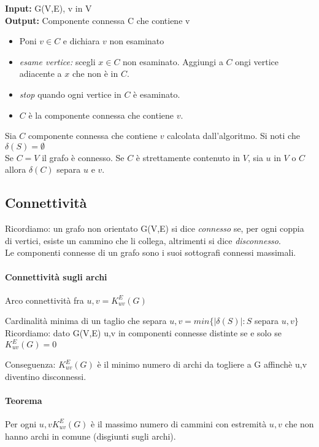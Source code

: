 \textbf{Input: }G(V,E), v in V \\
\textbf{Output:} Componente connessa C che contiene v \smallskip
\begin{itemize}
\item Poni $v \in C$ e dichiara $v$ non esaminato
\item \emph{esame vertice:} scegli $x \in C$ non esaminato. Aggiungi a $C$ ongi vertice adiacente a $x$ che non è in $C$.
\item \emph{stop} quando ogni vertice in $C$ è esaminato.
\item $C$ è la componente connessa che contiene $v$.
\end{itemize}
Sia $C$ componente connessa che contiene $v$ calcolata dall'algoritmo. Si noti che \(\delta(S) = \emptyset \) \\
Se $C=V$ il grafo è connesso. Se $C$ è strettamente contenuto in $V$, sia $u$ in $V$ o $C$ allora \(\delta(C)\) separa $u$ e $v$.\\

\subsection{Connettività}
Ricordiamo: un grafo non orientato G(V,E) si dice \emph{connesso} se, per ogni coppia di vertici, esiste
un cammino che li collega, altrimenti si dice \emph{disconnesso}. \\
Le componenti connesse di un grafo sono i suoi sottografi connessi massimali. 
\paragraph{Connettività sugli archi}
Arco connettività fra \( u,v = K^E_{uv} (G)\) 

\smallskip
\noindent
Cardinalità minima di un taglio che separa \( u,v = min \{ \mid \delta(S) \mid : S \) separa \( u,v \}\) \\
Ricordiamo: dato G(V,E) u,v in componenti connesse distinte se e solo se \(K^E_{uv} (G) =0\) 

\smallskip
\noindent
Conseguenza: \(K^E_{uv} (G)\) è il minimo numero di archi da togliere a G affinchè u,v diventino disconnessi. 

\smallskip
\paragraph{Teorema} Per ogni \(u,v K^E_{uv} (G)\) è il massimo numero di cammini con estremità $u,v$ che non hanno archi in comune (disgiunti sugli archi). 

